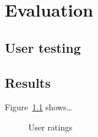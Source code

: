 \chapter{Evaluation}
\label{ch:evaluation}


\section{User testing}

\section{Results}

Figure~\ref{fig:user-ratings} shows…

\begin{figure}[H]
\centering

\caption{User ratings}
\label{fig:user-ratings}
\end{figure}
